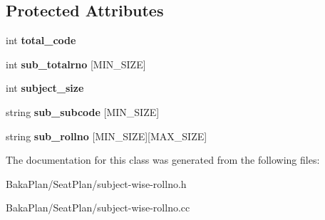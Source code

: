 \subsection*{Protected Attributes}
\begin{DoxyCompactItemize}
\item 
\hypertarget{classSubjectWiseRollNo_aa719b1f10268b6cc741132aced93a321}{int {\bfseries total\-\_\-code}}\label{classSubjectWiseRollNo_aa719b1f10268b6cc741132aced93a321}

\item 
\hypertarget{classSubjectWiseRollNo_a9700a22dff37ac2fd095cbcc3f3e2874}{int {\bfseries sub\-\_\-totalrno} \mbox{[}M\-I\-N\-\_\-\-S\-I\-Z\-E\mbox{]}}\label{classSubjectWiseRollNo_a9700a22dff37ac2fd095cbcc3f3e2874}

\item 
\hypertarget{classSubjectWiseRollNo_a9eef1e17ae0aace37af78b15395ee3e5}{int {\bfseries subject\-\_\-size}}\label{classSubjectWiseRollNo_a9eef1e17ae0aace37af78b15395ee3e5}

\item 
\hypertarget{classSubjectWiseRollNo_a3e21660fe01181bf4595c4fe2163c528}{string {\bfseries sub\-\_\-subcode} \mbox{[}M\-I\-N\-\_\-\-S\-I\-Z\-E\mbox{]}}\label{classSubjectWiseRollNo_a3e21660fe01181bf4595c4fe2163c528}

\item 
\hypertarget{classSubjectWiseRollNo_a20ba02f66c6a634c1f4daeb0bd27b481}{string {\bfseries sub\-\_\-rollno} \mbox{[}M\-I\-N\-\_\-\-S\-I\-Z\-E\mbox{]}\mbox{[}M\-A\-X\-\_\-\-S\-I\-Z\-E\mbox{]}}\label{classSubjectWiseRollNo_a20ba02f66c6a634c1f4daeb0bd27b481}

\end{DoxyCompactItemize}


The documentation for this class was generated from the following files\-:\begin{DoxyCompactItemize}
\item 
Baka\-Plan/\-Seat\-Plan/subject-\/wise-\/rollno.\-h\item 
Baka\-Plan/\-Seat\-Plan/subject-\/wise-\/rollno.\-cc\end{DoxyCompactItemize}
